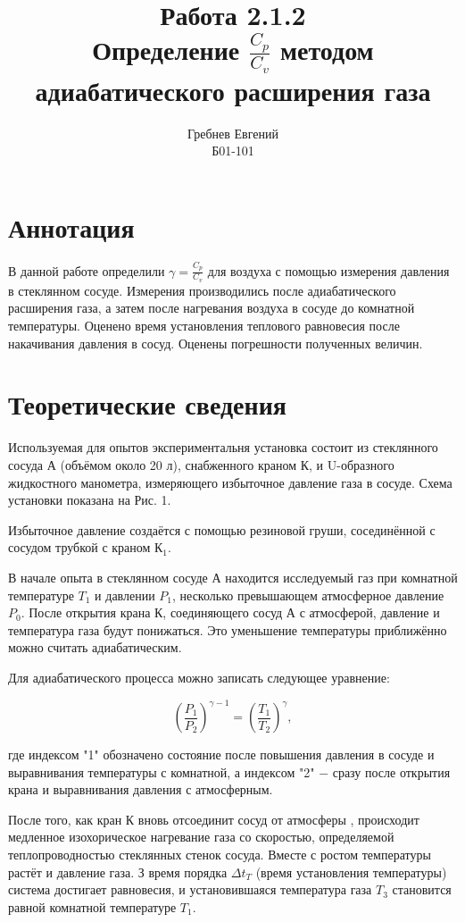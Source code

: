 \documentclass[a4paper, 12pt]{article}%
\author{Гребнев Евгений \\
	Б01-101}
\title{\textbf{Работа 2.1.2 \\ 
		Определение $\frac{C_{p}}{C_{v}}$ методом адиабатического расширения газа}}
\begin{document}
	\maketitle
	\section{Аннотация}
	В данной работе определили $\gamma = \frac{C_{p}}{C_{v}}$ для воздуха с помощью измерения давления в стеклянном сосуде. Измерения производились после адиабатического расширения газа, а затем после нагревания воздуха в сосуде до комнатной температуры. Оценено время установления теплового равновесия после накачивания давления в сосуд. Оценены погрешности полученных величин.
	\section{Теоретические сведения}
	Используемая для опытов экспериментальня установка состоит из стеклянного сосуда А (объёмом около 20 л), снабженного краном К, и U-образного жидкостного манометра, измеряющего избыточное давление газа в сосуде. Схема установки показана на Рис. 1. 
	
	Избыточное давление создаётся с помощью резиновой груши, сосединённой с сосудом трубкой с краном $К_1$.
	
	В начале опыта  в стеклянном сосуде А находится исследуемый газ при комнатной температуре $T_1$ и давлении $P_1$, несколько превышающем атмосферное давление  $P_0$. После открытия крана К, соединяющего сосуд А с атмосферой, давление и температура газа будут понижаться. Это уменьшение температуры приближённо можно считать адиабатическим. 
	
	Для адиабатического процесса можно записать следующее уравнение: 
	
	\begin{equation}\label{mk}
		\left(\dfrac{P_1}{P_2}\right)^{\gamma - 1} = \left(\dfrac{T_1}{T_2}\right)^\gamma , 
	\end{equation} 
	
	где индексом "1" обозначено состояние после повышения давления в сосуде и выравнивания температуры с комнатной, а индексом "2"  $-$ сразу после открытия крана и выравнивания давления с атмосферным. 
	
	После того, как кран К вновь отсоединит сосуд от атмосферы , происходит медленное изохорическое нагревание газа со скоростью, определяемой теплопроводностью стеклянных стенок сосуда. Вместе с ростом температуры растёт и давление газа. З время порядка $\Delta t_T$  (время установления температуры) система достигает равновесия, и установившаяся температура газа $T_3$ становится равной комнатной температуре $T_1$. 
	
\end{document}
